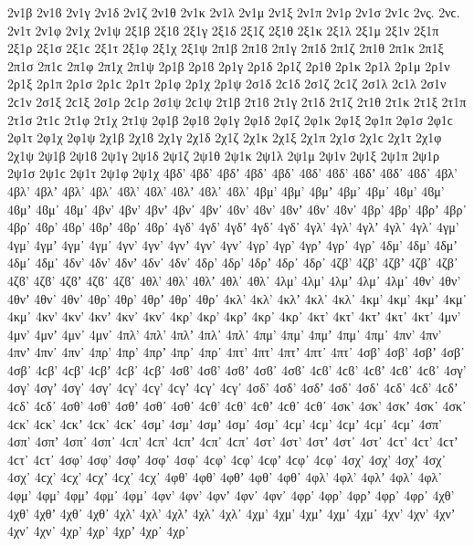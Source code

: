 {%
2ν1β 2ν1ϐ
2ν1γ
2ν1δ
2ν1ζ
2ν1θ
2ν1κ
2ν1λ
2ν1μ
2ν1ξ
2ν1π
2ν1ρ
2ν1σ 2ν1ϲ
2νς. 2νϲ.
2ν1τ
2ν1φ
2ν1χ
2ν1ψ
%
2ξ1β 2ξ1ϐ
2ξ1γ
2ξ1δ
2ξ1ζ
2ξ1θ
2ξ1κ
2ξ1λ
2ξ1μ
2ξ1ν
2ξ1π
2ξ1ρ
2ξ1σ 2ξ1ϲ
2ξ1τ
2ξ1φ
2ξ1χ
2ξ1ψ
%
2π1β 2π1ϐ
2π1γ
2π1δ
2π1ζ
2π1θ
2π1κ
2π1ξ
2π1σ 2π1ϲ
2π1φ
2π1χ
2π1ψ
%
2ρ1β 2ρ1ϐ
2ρ1γ
2ρ1δ
2ρ1ζ
2ρ1θ
2ρ1κ
2ρ1λ
2ρ1μ
2ρ1ν
2ρ1ξ
2ρ1π
2ρ1σ 2ρ1ϲ
2ρ1τ
2ρ1φ
2ρ1χ
2ρ1ψ
%
2σ1δ 2ϲ1δ   %
2σ1ζ 2ϲ1ζ
2σ1λ 2ϲ1λ
2σ1ν 2ϲ1ν
2σ1ξ 2ϲ1ξ
2σ1ρ 2ϲ1ρ
2σ1ψ 2ϲ1ψ
%
2τ1β 2τ1ϐ
2τ1γ
2τ1δ
2τ1ζ
2τ1θ
2τ1κ
2τ1ξ
2τ1π
2τ1σ 2τ1ϲ
2τ1φ
2τ1χ
2τ1ψ
%
2φ1β 2φ1ϐ
2φ1γ
2φ1δ
2φ1ζ
2φ1κ
2φ1ξ
2φ1π
2φ1σ 2φ1ϲ
2φ1τ
2φ1χ
2φ1ψ
%
2χ1β 2χ1ϐ
2χ1γ
2χ1δ
2χ1ζ
2χ1κ
2χ1ξ
2χ1π
2χ1σ 2χ1ϲ
2χ1τ
2χ1φ
2χ1ψ
%
2ψ1β 2ψ1ϐ
2ψ1γ
2ψ1δ
2ψ1ζ
2ψ1θ
2ψ1κ
2ψ1λ
2ψ1μ
2ψ1ν
2ψ1ξ
2ψ1π
2ψ1ρ
2ψ1σ 2ψ1ϲ
2ψ1τ
2ψ1φ
2ψ1χ
4βδ' 4βδ’ 4βδʼ 4βδ᾽ 4βδ᾿ 4ϐδ' 4ϐδ’ 4ϐδʼ 4ϐδ᾽ 4ϐδ᾿
4βλ' 4βλ’ 4βλʼ 4βλ᾽ 4βλ᾿ 4ϐλ' 4ϐλ’ 4ϐλʼ 4ϐλ᾽ 4ϐλ᾿
4βμ' 4βμ’ 4βμʼ 4βμ᾽ 4βμ᾿ 4ϐμ' 4ϐμ’ 4ϐμʼ 4ϐμ᾽ 4ϐμ᾿
4βν' 4βν’ 4βνʼ 4βν᾽ 4βν᾿ 4ϐν' 4ϐν’ 4ϐνʼ 4ϐν᾽ 4ϐν᾿
4βρ' 4βρ’ 4βρʼ 4βρ᾽ 4βρ᾿ 4ϐρ' 4ϐρ’ 4ϐρʼ 4ϐρ᾽ 4ϐρ᾿
%
4γδ' 4γδ’ 4γδʼ 4γδ᾽ 4γδ᾿
4γλ' 4γλ’ 4γλʼ 4γλ᾽ 4γλ᾿
4γμ' 4γμ’ 4γμʼ 4γμ᾽ 4γμ᾿
4γν' 4γν’ 4γνʼ 4γν᾽ 4γν᾿
4γρ' 4γρ’ 4γρʼ 4γρ᾽ 4γρ᾿
%
4δμ' 4δμ’ 4δμʼ 4δμ᾽ 4δμ᾿
4δν' 4δν’ 4δνʼ 4δν᾽ 4δν᾿
4δρ' 4δρ’ 4δρʼ 4δρ᾽ 4δρ᾿
%
4ζβ' 4ζβ’ 4ζβʼ 4ζβ᾽ 4ζβ᾿ 4ζϐ' 4ζϐ’ 4ζϐʼ 4ζϐ᾽ 4ζϐ᾿
%
4θλ' 4θλ’ 4θλʼ 4θλ᾽ 4θλ᾿
4λμ' 4λμ’ 4λμʼ 4λμ᾽ 4λμ᾿
4θν' 4θν’ 4θνʼ 4θν᾽ 4θν᾿
4θρ' 4θρ’ 4θρʼ 4θρ᾽ 4θρ᾿
%
4κλ' 4κλ’ 4κλʼ 4κλ᾽ 4κλ᾿
4κμ' 4κμ’ 4κμʼ 4κμ᾽ 4κμ᾿
4κν' 4κν’ 4κνʼ 4κν᾽ 4κν᾿
4κρ' 4κρ’ 4κρʼ 4κρ᾽ 4κρ᾿
4κτ' 4κτ’ 4κτʼ 4κτ᾽ 4κτ᾿
%
4μν' 4μν’ 4μνʼ 4μν᾽ 4μν᾿
%
4πλ' 4πλ’ 4πλʼ 4πλ᾽ 4πλ᾿
4πμ' 4πμ’ 4πμʼ 4πμ᾽ 4πμ᾿
4πν' 4πν’ 4πνʼ 4πν᾽ 4πν᾿
4πρ' 4πρ’ 4πρʼ 4πρ᾽ 4πρ᾿
4πτ' 4πτ’ 4πτʼ 4πτ᾽ 4πτ᾿
%
4σβ' 4σβ’ 4σβʼ 4σβ᾽ 4σβ᾿ 4ϲβ' 4ϲβ’ 4ϲβʼ 4ϲβ᾽ 4ϲβ᾿ 4σϐ' 4σϐ’ 4σϐʼ 4σϐ᾽ 4σϐ᾿ 4ϲϐ' 4ϲϐ’ 4ϲϐʼ 4ϲϐ᾽ 4ϲϐ᾿
4σγ' 4σγ’ 4σγʼ 4σγ᾽ 4σγ᾿ 4ϲγ' 4ϲγ’ 4ϲγʼ 4ϲγ᾽ 4ϲγ᾿
4σδ' 4σδ’ 4σδʼ 4σδ᾽ 4σδ᾿ 4ϲδ' 4ϲδ’ 4ϲδʼ 4ϲδ᾽ 4ϲδ᾿
4σθ' 4σθ’ 4σθʼ 4σθ᾽ 4σθ᾿ 4ϲθ' 4ϲθ’ 4ϲθʼ 4ϲθ᾽ 4ϲθ᾿
4σκ' 4σκ’ 4σκʼ 4σκ᾽ 4σκ᾿ 4ϲκ' 4ϲκ’ 4ϲκʼ 4ϲκ᾽ 4ϲκ᾿
4σμ' 4σμ’ 4σμʼ 4σμ᾽ 4σμ᾿ 4ϲμ' 4ϲμ’ 4ϲμʼ 4ϲμ᾽ 4ϲμ᾿
4σπ' 4σπ’ 4σπʼ 4σπ᾽ 4σπ᾿ 4ϲπ' 4ϲπ’ 4ϲπʼ 4ϲπ᾽ 4ϲπ᾿
4στ' 4στ’ 4στʼ 4στ᾽ 4στ᾿ 4ϲτ' 4ϲτ’ 4ϲτʼ 4ϲτ᾽ 4ϲτ᾿
4σφ' 4σφ’ 4σφʼ 4σφ᾽ 4σφ᾿ 4ϲφ' 4ϲφ’ 4ϲφʼ 4ϲφ᾽ 4ϲφ᾿
4σχ' 4σχ’ 4σχʼ 4σχ᾽ 4σχ᾿ 4ϲχ' 4ϲχ’ 4ϲχʼ 4ϲχ᾽ 4ϲχ᾿
%
4φθ' 4φθ’ 4φθʼ 4φθ᾽ 4φθ᾿
4φλ' 4φλ’ 4φλʼ 4φλ᾽ 4φλ᾿
4φμ' 4φμ’ 4φμʼ 4φμ᾽ 4φμ᾿
4φν' 4φν’ 4φνʼ 4φν᾽ 4φν᾿
4φρ' 4φρ’ 4φρʼ 4φρ᾽ 4φρ᾿
%
4χθ' 4χθ’ 4χθʼ 4χθ᾽ 4χθ᾿
4χλ' 4χλ’ 4χλʼ 4χλ᾽ 4χλ᾿
4χμ' 4χμ’ 4χμʼ 4χμ᾽ 4χμ᾿
4χν' 4χν’ 4χνʼ 4χν᾽ 4χν᾿
4χρ' 4χρ’ 4χρʼ 4χρ᾽ 4χρ᾿
}
